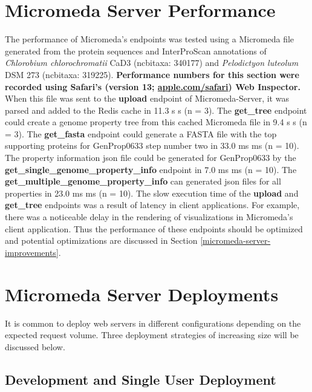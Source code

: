 \section{Micromeda Server Performance} \label{micromeda-server-performance}

The performance of Micromeda's endpoints was tested using a Micromeda file 
generated from the protein sequences and InterProScan annotations of 
\textit{Chlorobium chlorochromatii} CaD3 (\gls{ncbitaxa}: 340177) and 
\textit{Pelodictyon luteolum} DSM 273 (\gls{ncbitaxa}:  319225). 
\textbf{Performance numbers for this section were recorded using Safari's 
(version 13; \href{http://apple.com/safari}{apple.com/safari}) Web Inspector.} 
When this file was sent to the \textbf{upload} endpoint of Micromeda-Server, it 
was parsed and added to the Redis cache in 11.3 s  s (\gls{n} = 3). 
The \textbf{get\_tree} endpoint could create a genome property tree from this 
cached Micromeda file in 9.4 s  s (\gls{n} = 3). The 
\textbf{get\_fasta} endpoint could generate a FASTA file with the top supporting 
proteins for GenProp0633 step number two in 33.0 ms  ms (\gls{n} = 
10). The property information \gls{json} file could be generated for GenProp0633 
by the \textbf{get\_single\_genome\_property\_info} endpoint in 7.0 ms  ms (\gls{n} = 10). The \textbf{get\_multiple\_genome\_property\_info} can 
generated \gls{json} files for all properties in 23.0 ms  ms (\gls{n} 
= 10). The slow execution time of the \textbf{upload} and \textbf{get\_tree} 
endpoints was a result of latency in client applications. For example, there was 
a noticeable delay in the rendering of visualizations in Micromeda's client 
application. Thus the performance of these endpoints should be optimized and 
potential optimizations are discussed in Section 
\ref{micromeda-server-improvements}.

\section{Micromeda Server Deployments} \label{micromeda-server-deployments}

It is common to deploy web servers in different configurations depending on the 
expected request volume. Three deployment strategies of increasing size will be 
discussed below. 

\subsection{Development and Single User Deployment}

